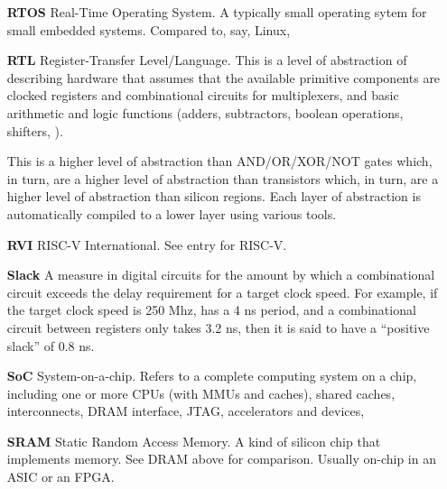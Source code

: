 \begin{itemize}
\item[\bf RTOS] Real-Time Operating System.  A typically small
  operating sytem for small embedded systems.  Compared to, say,
  Linux,

\item[\bf RTL] Register-Transfer Level/Language.  This is a level of
  abstraction of describing hardware that assumes that the available
  primitive components are clocked registers and combinational
  circuits for multiplexers, and basic arithmetic and logic functions
  (adders, subtractors, boolean operations, shifters, {\etc}).

  This is a higher level of abstraction than AND/OR/XOR/NOT gates
  which, in turn, are a higher level of abstraction than transistors
  which, in turn, are a higher level of abstraction than silicon
  regions.  Each layer of abstraction is automatically compiled to a
  lower layer using various tools.

\item[\bf RVI] RISC-V International.  See entry for RISC-V.

\item[\bf Slack] A measure in digital circuits for the amount by which
  a combinational circuit exceeds the delay requirement for a target
  clock speed.  For example, if the target clock speed is 250 Mhz,
  {\ie} has a 4 ns period, and a combinational circuit between
  registers only takes 3.2 ns, then it is said to have a ``positive
  slack'' of 0.8 ns.

\item[\bf SoC] System-on-a-chip.  Refers to a complete computing
  system on a chip, including one or more CPUs (with MMUs and caches),
  shared caches, interconnects, DRAM interface, JTAG, accelerators and
  devices, {\etc}

\item[\bf SRAM] Static Random Access Memory.  A kind of silicon chip
  that implements memory.  See DRAM above for comparison.  Usually
  on-chip in an ASIC or an FPGA.


\end{itemize}
